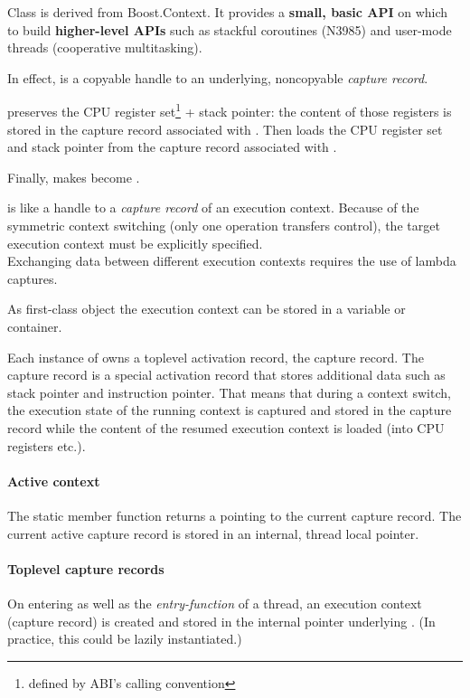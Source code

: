 Class \ectx is derived from Boost.Context\cite{bcontext}. It
provides a {\bfseries small, basic API} on which to build {\bfseries
higher-level APIs} such as stackful coroutines (N3985\cite{N3985}) and user-mode
threads (cooperative multitasking).

In effect,  is a copyable handle to an underlying,
noncopyable \emph{capture record}.

 preserves the CPU register
set\footnote{defined by ABI's calling convention} + stack pointer: the content
of those registers is stored in the capture record associated with
. Then  loads the CPU
register set and stack pointer from the capture record associated with
.

Finally, 
makes  become .

is like a handle to a \emph{capture record} of an execution context.
Because of the symmetric context switching (only one operation transfers
control), the target execution context must be explicitly specified.\\
Exchanging data between different execution contexts requires the use of lambda
captures.

As first-class object the execution context can be stored in a variable or
container.

Each instance of \ectx owns a toplevel activation record, the capture record.
The capture record is a special activation record that stores additional data
such as stack pointer and instruction pointer. That means that during a
context switch, the execution state of the running context is captured and
stored in the capture record while the content of the resumed execution
context is loaded (into CPU registers etc.).

\paragraph*{Active context}
The static member function \ectxcurrent returns a \ectx pointing to the
current capture record. The current active capture record is stored in an
internal, thread local pointer.

\paragraph*{Toplevel capture records}
On entering \main as well as the \emph{entry-function} of a thread, an execution
context (capture record) is created and stored in the internal pointer
underlying \ectxcurrent. (In practice, this could be lazily instantiated.)

